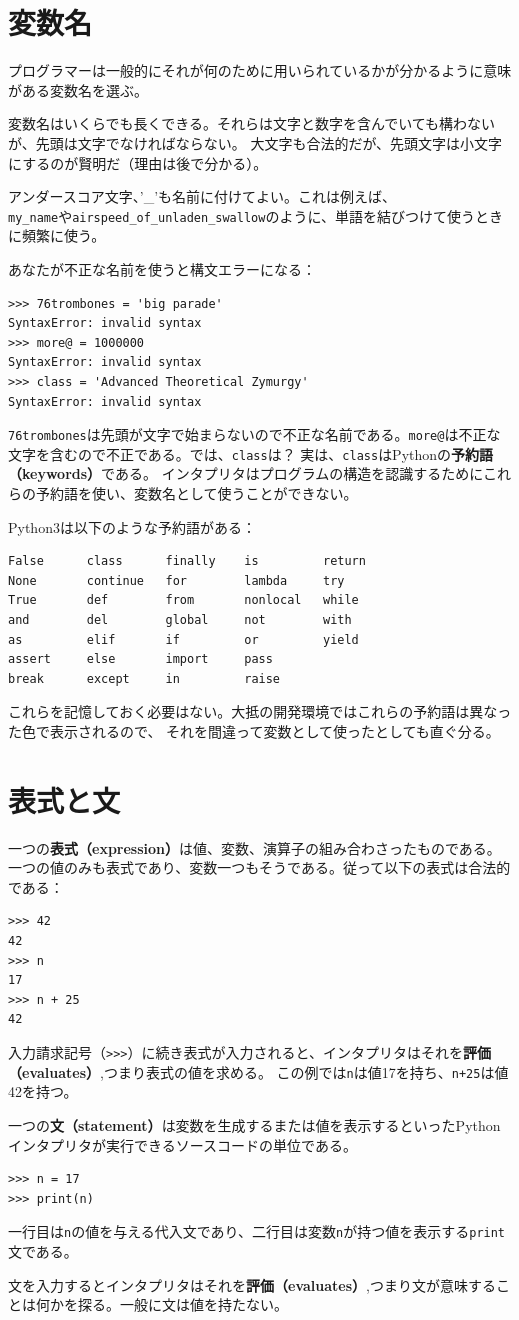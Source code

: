 \documentclass[a4j,12pt,makeidx]{jbook}
\begin{document}
\section{変数名}
プログラマーは一般的にそれが何のために用いられているかが分かるように意味がある変数名を選ぶ。\par
変数名はいくらでも長くできる。それらは文字と数字を含んでいても構わないが、先頭は文字でなければならない。
大文字も合法的だが、先頭文字は小文字にするのが賢明だ（理由は後で分かる）。\par
アンダースコア文字、{'\_'}も名前に付けてよい。これは例えば、\\
{\tt my\_name}や{\tt airspeed\_of\_unladen\_swallow}のように、単語を結びつけて使うときに頻繁に使う。\par
あなたが不正な名前を使うと構文エラーになる：
\begin{verbatim}
>>> 76trombones = 'big parade'
SyntaxError: invalid syntax
>>> more@ = 1000000
SyntaxError: invalid syntax
>>> class = 'Advanced Theoretical Zymurgy'
SyntaxError: invalid syntax
\end{verbatim}
{\tt 76trombones}は先頭が文字で始まらないので不正な名前である。{\tt more@}は不正な文字を含むので不正である。では、{\tt class}は？
実は、{\tt class}はPythonの{\bf 予約語（keywords）}である。
インタプリタはプログラムの構造を認識するためにこれらの予約語を使い、変数名として使うことができない。\par
Python3は以下のような予約語がある：
\begin{verbatim}
False      class      finally    is         return
None       continue   for        lambda     try
True       def        from       nonlocal   while
and        del        global     not        with
as         elif       if         or         yield
assert     else       import     pass
break      except     in         raise
\end{verbatim}
これらを記憶しておく必要はない。大抵の開発環境ではこれらの予約語は異なった色で表示されるので、
それを間違って変数として使ったとしても直ぐ分る。
%
\section{表式と文}
一つの{\bf 表式（expression）}は値、変数、演算子の組み合わさったものである。
一つの値のみも表式であり、変数一つもそうである。従って以下の表式は合法的である：
\begin{verbatim}
>>> 42
42
>>> n
17
>>> n + 25
42
\end{verbatim}
入力請求記号（{\tt >>>}）に続き表式が入力されると、インタプリタはそれを{\bf 評価（evaluates）},つまり表式の値を求める。
この例では{\tt n}は値17を持ち、{\tt n+25}は値42を持つ。\par
一つの{\bf 文（statement）}は変数を生成するまたは値を表示するといったPythonインタプリタが実行できるソースコードの単位である。
\begin{verbatim}
>>> n = 17
>>> print(n)
\end{verbatim}
一行目は{\tt n}の値を与える代入文であり、二行目は変数{\tt n}が持つ値を表示する{\tt print}文である。\par
文を入力するとインタプリタはそれを{\bf 評価（evaluates）},つまり文が意味することは何かを探る。一般に文は値を持たない。
%
\end{document}
